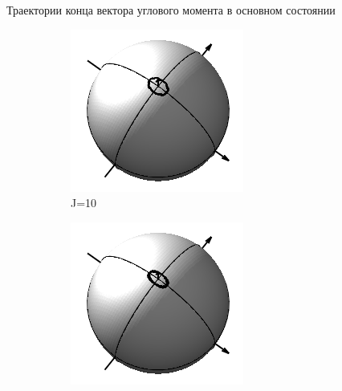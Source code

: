 \documentclass[hyperref={pdfpagelabels=false},usepdftitle=false, xcolor = dvipsnames]{beamer}
\begin{document}
\begin{frame}{Траектории конца вектора углового момента в основном состоянии}
\begin{block}{}
\begin{figure}
  \begin{subfigure}{0.3\textwidth}
	\includegraphics[width = \linewidth]{../pictures/rigid_base/plot_J=10n=0.png}
	\caption{J=10}
  \end{subfigure}
  \begin{subfigure}{0.3\textwidth}
    \includegraphics[width = \linewidth]{../pictures/rigid_base/plot_J=15n=0.png}

\end{subfigure}
\end{figure}
\end{block}
\end{frame}
\end{document}
